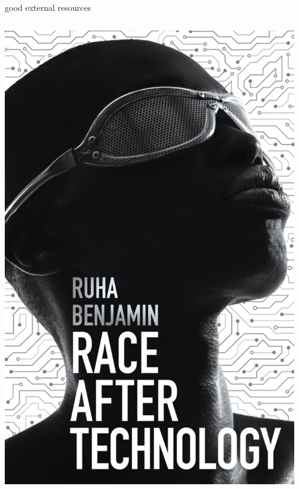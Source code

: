\documentclass[aspectratio=43,17pt]{beamer} %
\begin{document}
\begin{frame}{good external resources}
\begin{columns}
\begin{column}{0.33\textwidth}
\includegraphics[width=\textwidth]{figures/books/Race_After_Technology.jpeg}
\end{column}
\begin{column}{0.33\textwidth}

\end{column}
\end{columns}
\end{frame}
\end{document}
